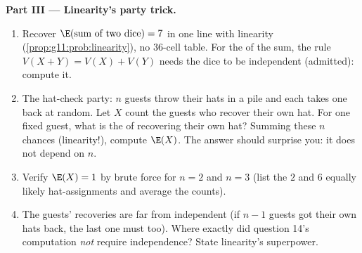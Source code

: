 \begin{problem}
\medskip
\noindent\textbf{Part III --- Linearity's party trick.}
\begin{enumerate}[resume]
  \item Recover $\E(\text{sum of two dice}) = 7$ in one line
        with linearity (\cref{prop:g11:prob:linearity}), no
        $36$-cell table. For the \emph{} of the sum,
        the rule $V(X + Y) = V(X) + V(Y)$ needs the dice to be
        independent (admitted): compute it.
  \item The hat-check party: $n$ guests throw their hats in a
        pile and each takes one back at random. Let $X$ count
        the guests who recover their own hat. For one fixed
        guest, what is the  of recovering their own
        hat? Summing these $n$ chances (linearity!), compute
        $\E(X)$. The answer should surprise you: it does not
        depend on $n$.
  \item Verify $\E(X) = 1$ by brute force for $n = 2$ and
        $n = 3$ (list the $2$ and $6$ equally likely
        hat-assignments and average the counts).
  \item The guests' recoveries are far from independent (if
        $n - 1$ guests got their own hats back, the last one
        must too). Where exactly did question 14's computation
        \emph{not} require independence? State linearity's
        superpower.
\end{enumerate}


\end{problem}
